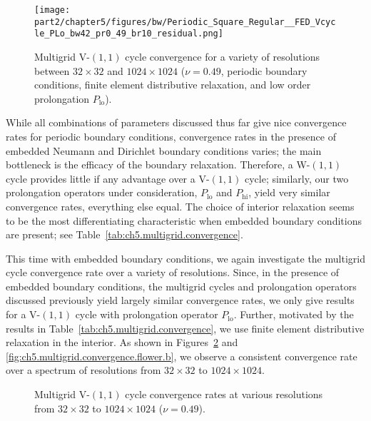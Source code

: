 \setlength{\figurewidth}{0.45\columnwidth}
\begin{figure}[htbp]
\begin{center}
\texttt{[image: part2/chapter5/figures/bw/Periodic\_Square\_Regular\_\_FED\_Vcycle\_PLo\_bw42\_pr0\_49\_br10\_residual.png]}
\caption{Multigrid V-$(1,1)$ cycle convergence for a variety of resolutions between $32 \times 32$ and $1024 \times 1024$ ($\nu = 0.49$, periodic boundary conditions, finite element distributive relaxation, and low order prolongation $P_{\text{lo}}$).}
\label{fig:ch5.multigrid.convergence.resolution}
\end{center}
\end{figure}

While all combinations of parameters discussed thus far give nice convergence rates for periodic boundary conditions, convergence rates in the presence of embedded Neumann and Dirichlet boundary conditions varies; the main bottleneck is the efficacy of the boundary relaxation. Therefore, a W-$(1,1)$ cycle provides little if any advantage over a V-$(1,1)$ cycle; similarly, our two prolongation operators under consideration, $P_{\text{lo}}$ and $P_{\text{hi}}$, yield very similar convergence rates, everything else equal. The choice of interior relaxation seems to be the most differentiating characteristic when embedded boundary conditions are present; see Table~\ref{tab:ch5.multigrid.convergence}.

This time with embedded boundary conditions, we again investigate the multigrid cycle convergence rate over a variety of resolutions. Since, in the presence of embedded boundary conditions, the multigrid cycles and prolongation operators discussed previously yield largely similar convergence rates, we only give results for a V-$(1,1)$ cycle with prolongation operator $P_{\text{lo}}$. Further, motivated by the results in Table~\ref{tab:ch5.multigrid.convergence}, we use finite element distributive relaxation in the interior. As shown in Figures~\ref{fig:ch5.multigrid.convergence.flower.a} and \ref{fig:ch5.multigrid.convergence.flower.b}, we observe a consistent convergence rate over a spectrum of resolutions from $32 \times 32$ to $1024 \times 1024$.

\setlength{\figurewidth}{0.45\columnwidth}
\begin{figure}[htbp]
\begin{center}
\caption{Multigrid V-$(1,1)$ cycle convergence rates at various resolutions from $32 \times 32$ to $1024 \times 1024$ ($\nu = 0.49$).}
\label{fig:ch5.multigrid.convergence.flower.a}
\end{center}
\end{figure}

